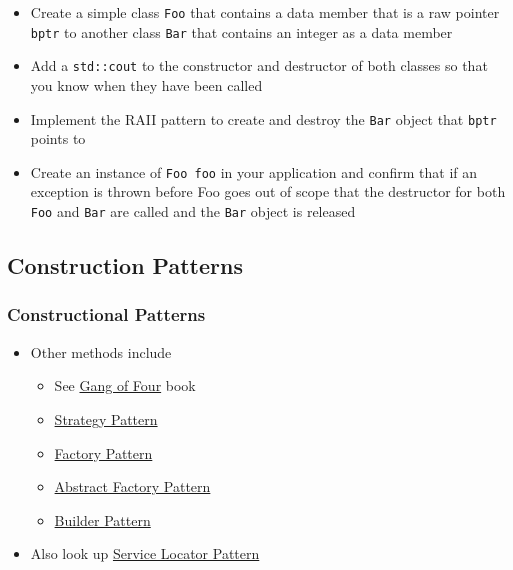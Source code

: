 \begin{itemize}
\itemsep1pt\parskip0pt
\item
  Create a simple class \texttt{Foo} that contains a data member that is
  a raw pointer \texttt{bptr} to another class \texttt{Bar} that
  contains an integer as a data member
\item
  Add a \texttt{std::cout} to the constructor and destructor of both
  classes so that you know when they have been called
\item
  Implement the RAII pattern to create and destroy the \texttt{Bar}
  object that \texttt{bptr} points to
\item
  Create an instance of \texttt{Foo foo} in your application and confirm
  that if an exception is thrown before Foo goes out of scope that the
  destructor for both \texttt{Foo} and \texttt{Bar} are called and the
  \texttt{Bar} object is released
\end{itemize}

\subsection{Construction Patterns}\label{construction-patterns}

\subsubsection{Constructional Patterns}\label{constructional-patterns}

\begin{itemize}
\itemsep1pt\parskip0pt
\item
  Other methods include

  \begin{itemize}
  \itemsep1pt\parskip0pt
  \item
    See \href{https://en.wikipedia.org/wiki/Design_Patterns}{Gang of
    Four} book
  \item
    \href{https://en.wikipedia.org/wiki/Strategy_pattern}{Strategy
    Pattern}
  \item
    \href{https://en.wikipedia.org/wiki/Factory_method_pattern}{Factory
    Pattern}
  \item
    \href{https://en.wikipedia.org/wiki/Abstract_factory_pattern}{Abstract
    Factory Pattern}
  \item
    \href{https://en.wikipedia.org/wiki/Builder_pattern}{Builder
    Pattern}\\
  \end{itemize}
\item
  Also look up
  \href{https://en.wikipedia.org/wiki/Service_locator_pattern}{Service
  Locator Pattern}
\end{itemize}

